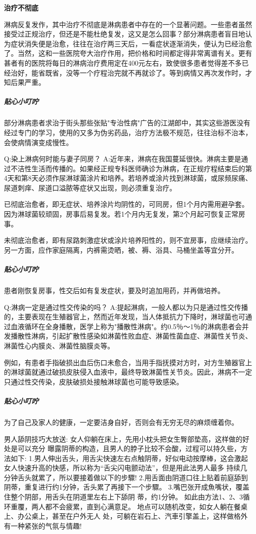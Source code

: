 \documentclass[12pt,UTF8]{ctexbook}
\begin{document}
\textbf{治疗不彻底}

淋病反复发作，其中治疗不彻底是淋病患者中存在的一个显著问题。一些患者虽然接受过正规治疗，但还是不能杜绝复发，这又是怎么回事？部分淋病患者盲目地认为症状消失便是治愈，往往在治疗两三天后，一看症状逐渐消失，便认为已经治愈了。当然，这和一些医院夸大治疗作用，把价格和时间都定得非常离谱有关。更有甚者有的医院将每日的淋病治疗费用定在400元左右，致使很多患者觉得差不多已经治好，能省既省，没等一个疗程治完就不再就诊了。等到病情又再次发作时，才知后果严重。

\subparagraph{贴心小叮咛}

部分淋病患者求治于街头那些张贴"专治性病"广告的江湖郎中，其实这些游医没有经过专门的学习，使用的又多为伪劣药品，治疗方法极不规范，往往治标不治本，会使病情演变成慢性。

Q:染上淋病何时能与妻子同房？
A:近年来，淋病在我国蔓延很快。淋病主要是通过不洁性生活而传播的。如果经正规专科医师确诊为淋病，在正规疗程结束后的第4天和第8天必须作尿淋球菌涂片和培养。若培养或涂片找到淋球菌，或尿频尿痛、尿道刺痒、尿道口溢脓等症状又出现，则必须重复治疗。

已彻底治愈者，即无症状、培养涂片均阴性的，可同房，但1个月内需用避孕套。因为淋球菌较顽固，房事后易复发。若1个月内无复发，第2个月起可恢复正常房事。

未彻底治愈者，即有尿路刺激症状或涂片培养阳性的，则不宜房事，应继续治疗。另一方面，应作家庭隔离，内裤需烫晒，被、褥、浴具、马桶坐盖等宜分开。

\subparagraph{贴心小叮咛}

患者刚恢复房事，性交后如有复发症状，要及时追加用药，并再做培养。

Q:淋病一定是通过性交传染的吗？
A:提起淋病，一般人都以为只是通过性交传播的，主要表现在生殖器官上，然而近年发现，当人体抵抗力下降时，淋球菌也可通过血液循环在全身播散，医学上称为"播散性淋病"。约0.5％～1％的淋病患者会并发播散性淋病，引起扩散性感染如淋菌性败血症、淋菌性菌血症、淋菌性关节炎、淋菌性心内膜炎、淋菌性脑膜炎等。

例如，有患者手指破损出血后伤口未愈合，当用手指抚摸对方时，对方生殖器官上的淋球菌就通过破损皮肤侵入血液中，最终导致淋菌性关节炎。因此，淋病不一定只通过性交传染，皮肤破损处接触淋球菌也可能导致感染。

\subparagraph{贴心小叮咛}

为了自己及家人的健康，一定要洁身自好，否则会有无穷无尽的麻烦缠着你。

男人舔阴技巧大放送:
女人仰躺在床上，先用小枕头把女生臀部垫高，这样做的好处是可以充分
曝露阴蒂的构造，且男人的脖子比较不会酸，过程可以持久些，方法如下:
1.男人伸出舌头，用舌尖快速左右点触阴蒂，好似电动按摩棒，这会激起
女人快速升高的快感，所以称为“舌尖闪电颤动法”，但是用此法男人最多
持续几分钟舌头就累了，所以要接着做以下的步驟!
2.用舌面由阴道口往上贴着前庭舔到阴蒂，重复进行约1分钟，舌头累了再接下一个步驟。
3.嘴巴张开成魚嘴状，覆盖住整个阴部，用舌头在阴道里左右上下舔阴
蒂，约1分钟。
如此由方法1、2、3循环重覆，两人都不会疲累，直到心满意足。
地点可以随机改变，如女人躺在餐桌上、办公桌上，甚至在户外无人
处，可躺在岩石上、汽車引擎盖上，这样做格外有一种紧张的气氛与情趣!
\end{document}
